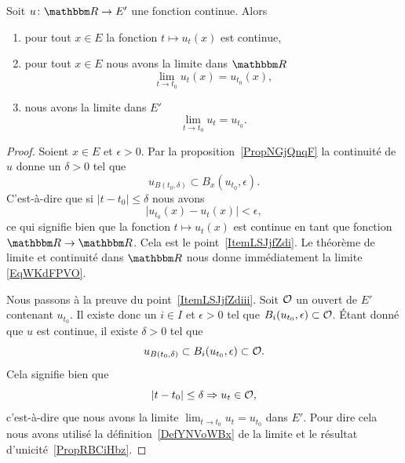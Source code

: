 \begin{proposition} \label{PropVKSNflB}
    Soit \( u\colon \eR\to E'\) une fonction continue. Alors
    \begin{enumerate}
        \item   \label{ItemLSJjfZdi}
            pour tout \( x\in E\) la fonction \( t\mapsto u_t(x)\) est continue,
        \item\label{ItemLSJjfZdii}
            pour tout \( x\in E\) nous avons la limite dans \( \eR\)
            \begin{equation}    \label{EqWKdFPVO}
                \lim_{t\to t_0} u_t(x)=u_{t_0}(x),
            \end{equation}
        \item\label{ItemLSJjfZdiii}
            nous avons la limite dans \( E'\)
            \begin{equation}
                \lim_{t\to t_0} u_t=u_{t_0}.
            \end{equation}
    \end{enumerate}
\end{proposition}

\begin{proof}
    Soient \( x\in E\) et \( \epsilon> 0\). Par la proposition~\ref{PropNGjQnqF} la continuité de \( u\) donne un \( \delta>0\) tel que
    \begin{equation}
        u_{B(t_0,\delta)}\subset B_x(u_{t_0},\epsilon).
    \end{equation}
    C'est-à-dire que si \( | t-t_0 |\leq \delta\) nous avons
    \begin{equation}
        \big| u_{t_0}(x)-u_t(x) \big|<\epsilon,
    \end{equation}
    ce qui signifie bien que la fonction \( t\mapsto u_t(x)\) est continue en tant que fonction \( \eR\to \eR\). Cela est le point~\ref{ItemLSJjfZdi}. Le théorème de limite et continuité dans \( \eR\) nous donne immédiatement la limite \eqref{EqWKdFPVO}.

    Nous passons à la preuve du point~\ref{ItemLSJjfZdiii}. Soit \( \mathcal{O}\) un ouvert de \( E'\) contenant \( u_{t_0}\). Il existe donc un \( i\in I\) et \( \epsilon>0\) tel que \( B_i(u_{t_0},\epsilon)\subset \mathcal{O}\). Étant donné que \( u\) est continue, il existe \( \delta>0\) tel que
    \begin{equation}
        u_{B(t_0,\delta)}\subset B_i(u_{t_0},\epsilon)\subset \mathcal{O}.
    \end{equation}
    Cela signifie bien que
    \begin{equation}
        | t-t_0 |\leq \delta\Rightarrow u_t\in\mathcal{O},
    \end{equation}
    c'est-à-dire que nous avons la limite \( \lim_{t\to t_0} u_t=u_{t_0}\) dans \( E'\). Pour dire cela nous avons utilisé la définition~\ref{DefYNVoWBx} de la limite et le résultat d'unicité~\ref{PropRBCiHbz}.
\end{proof}

